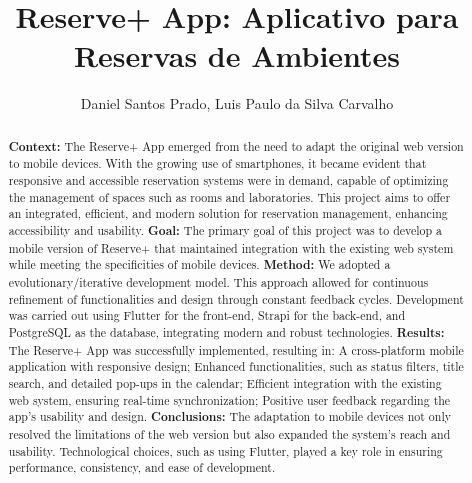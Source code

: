\documentclass[12pt]{article}
\title{Reserve+ App: Aplicativo para Reservas de Ambientes}
\author{Daniel Santos Prado, Luis Paulo da Silva Carvalho}%
\begin{document}
 

\maketitle

\begin{abstract}
\textbf{Context:} The Reserve+ App emerged from the need to adapt the original web version to mobile devices. With the growing use of smartphones, it became evident that responsive and accessible reservation systems were in demand, capable of optimizing the management of spaces such as rooms and laboratories. This project aims to offer an integrated, efficient, and modern solution for reservation management, enhancing accessibility and usability. \textbf{Goal:}  The primary goal of this project was to develop a mobile version of Reserve+ that maintained integration with the existing web system while meeting the specificities of mobile devices. \textbf{Method:} We adopted a evolutionary/iterative development model. This approach allowed for continuous refinement of functionalities and design through constant feedback cycles. Development was carried out using Flutter for the front-end, Strapi for the back-end, and PostgreSQL as the database, integrating modern and robust technologies. \textbf{Results:} The Reserve+ App was successfully implemented, resulting in: 
A cross-platform mobile application with responsive design; Enhanced functionalities, such as status filters, title search, and detailed pop-ups in the calendar; Efficient integration with the existing web system, ensuring real-time synchronization; Positive user feedback regarding the app’s usability and design. \textbf{Conclusions:} The adaptation to mobile devices not only resolved the limitations of the web version but also expanded the system’s reach and usability. Technological choices, such as using Flutter, played a key role in ensuring performance, consistency, and ease of development. 
\end{abstract}
     
\end{document}
